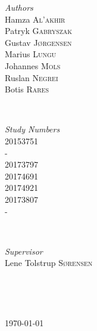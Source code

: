 \documentclass[12p]{article}
\begin{document}
\begin{titlepage}
	\begin{minipage}{0.4\textwidth}
    \begin{flushleft} \large
    \emph{Authors}\\
        Hamza \textsc{Al'akhir} \\
        Patryk \textsc{Gabryszak} \\
    	Gustav \textsc{Jørgensen} \\
    	Marius \textsc{Lungu} \\
    	Johannes \textsc{Mols} \\
    	Ruslan \textsc{Negrei} \\
    	Botis \textsc{Rares} \\
    \end{flushleft}
    \end{minipage}
    ~
    \begin{minipage}{0.4\textwidth}
    \begin{flushright} \large
    \emph{Study Numbers} \\
        20153751 \\
        - \\
        20173797 \\
        20174691 \\
        20174921 \\
        20173807\\
        - \\
    \end{flushright}
    \end{minipage}\\[0.5cm]
    
    
    \begin{minipage}{0.4\textwidth}
    \begin{flushleft} \large
    \emph{Supervisor}\\
        Lene Tolstrup \textsc{Sørensen} \\
    \end{flushleft}
    \end{minipage}
    ~
    \begin{minipage}{0.4\textwidth}
    \begin{flushright} \large
    \end{flushright}
    \end{minipage}\\[0.5cm]

	
	\vfill\vfill\vfill %
	
	{\large\today} %
	
    
\end{titlepage}
\end{document}
